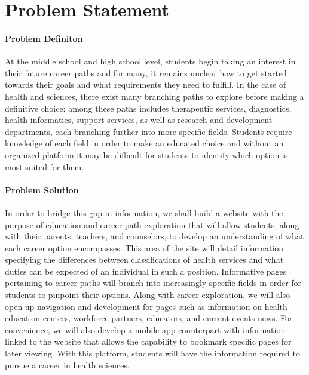 \documentclass[letterpaper,10pt]{article}
\begin{document}
  \section {Problem Statement}	
    \paragraph {Problem Definiton}
At the middle school and high school level, students begin taking an interest in their future career paths and for many, it remains unclear how to get started towards their goals and what requirements they need to fulfill. In the case of health and sciences, there exist many branching paths to explore before making a definitive choice: among these paths includes therapeutic services, diagnostics, health informatics, support services, as well as research and development departments, each branching further into more specific fields. Students require knowledge of each field in order to make an educated choice and without an organized platform it may be difficult for students to identify which option is most suited for them. 




 \paragraph {Problem Solution}
In order to bridge this gap in information, we shall build a website with the purpose of education and career path exploration that will allow students, along with their parents, teachers, and counselors, to develop an understanding of what each career option encompasses. This area of the site will detail information specifying the differences between classifications of health services and what duties can be expected of an individual in such a position.  Informative pages pertaining to career paths will branch into increasingly specific fields  in order for students to pinpoint their options. Along with career exploration, we will also open up navigation and development for pages such as information on health education centers, workforce partners, educators, and current events news. For convenience, we will also develop a mobile app counterpart with information linked to the website that allows the capability to bookmark specific pages for later viewing. With this platform, students will have the information required to pursue a career in health sciences.
\end{document}
